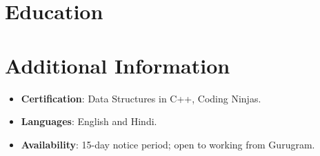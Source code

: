 \documentclass[11pt,a4paper,sans]{moderncv}
\begin{document}
\section{Education}
\vspace{1pt}


\section{Additional Information}
\vspace{1pt}
\begin{itemize}
\item {\textbf{Certification}: Data Structures in C++, Coding Ninjas.}
\item {\textbf{Languages}: English and Hindi.}
\item {\textbf{Availability}: 15-day notice period; open to working from Gurugram.}
\end{itemize}
\end{document}
